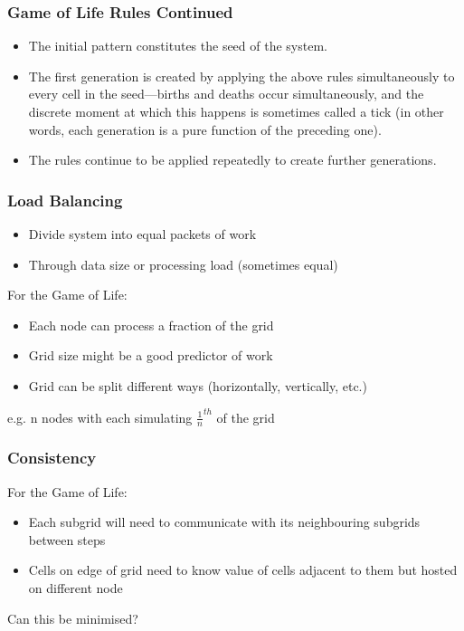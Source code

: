\documentclass{beamer}
\begin{document}
         \begin{frame}
         	\frametitle{Game of Life Rules Continued}
         	\begin{itemize}
         		\item The initial pattern constitutes the seed of the system.
         		\item The first generation is created by applying the above rules simultaneously to every cell in the seed—births and deaths occur simultaneously, and the discrete moment at which this happens is sometimes called a tick (in other words, each generation is a pure function of the preceding one).
         		\item The rules continue to be applied repeatedly to create further generations.
         	\end{itemize}
         	  
         \end{frame}       
    \begin{frame}
    	\frametitle{Load Balancing}
    	\begin{itemize}
    		\item Divide system into equal packets of work
    		\item Through data size or processing load (sometimes equal)
    	\end{itemize}
    	For the Game of Life:
    	\begin{itemize}
    		\item Each node can process a fraction of the grid
    		\item Grid size might be a good predictor of work
    		\item Grid can be split different ways (horizontally, vertically, etc.)
    	\end{itemize}
    	e.g. n nodes with each simulating $\frac{1}{n} ^{th}$ of the grid
    \end{frame}         	
       \begin{frame}
       	\frametitle{Consistency}
       	For the Game of Life:
       	\begin{itemize}
       		\item Each subgrid will need to communicate with its neighbouring subgrids between steps
       		\item Cells on edge of grid need to know value of cells adjacent to them but hosted on different node
       	\end{itemize}
       	Can this be minimised?
       \end{frame}      	
\end{document}

